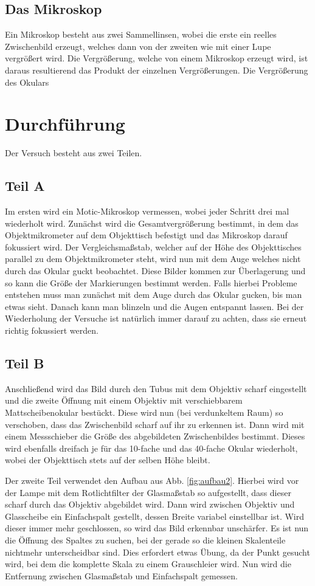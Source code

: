 \documentclass[12pt,a4paper,titlepage,headinclude,bibtotoc]{scrartcl}
\begin{document}
\subsection{Das Mikroskop}
Ein Mikroskop besteht aus zwei Sammellinsen, wobei die erste ein reelles Zwischenbild erzeugt, welches dann von der zweiten wie mit einer Lupe vergrößert wird.
Die Vergrößerung, welche von einem Mikroskop erzeugt wird, ist daraus resultierend das Produkt der einzelnen Vergrößerungen.
Die Vergrößerung des Okulars 

\section{Durchführung}
\label{sec:durchfuehrung}
Der Versuch besteht aus zwei Teilen.
\subsection{Teil A}
Im ersten wird ein Motic-Mikroskop vermessen, wobei jeder Schritt drei mal wiederholt wird.
Zunächst wird die Gesamtvergrößerung bestimmt, in dem das Objektmikrometer auf dem Objekttisch befestigt und das Mikroskop darauf fokussiert wird.
Der Vergleichsmaßstab, welcher auf der Höhe des Objekttisches parallel zu dem Objektmikrometer steht, wird nun mit dem Auge welches nicht durch das Okular guckt beobachtet.
Diese Bilder kommen zur Überlagerung und so kann die Größe der Markierungen bestimmt werden.
Falls hierbei Probleme entstehen muss man zunächst mit dem Auge durch das Okular gucken, bis man etwas sieht.
Danach kann man blinzeln und die Augen entspannt lassen.
Bei der Wiederholung der Versuche ist natürlich immer darauf zu achten, dass sie erneut richtig fokussiert werden.
\subsection{Teil B}
Anschließend wird das Bild durch den Tubus mit dem Objektiv scharf eingestellt und die zweite Öffnung mit einem Objektiv mit verschiebbarem Mattscheibenokular bestückt.
Diese wird nun (bei verdunkeltem Raum) so verschoben, dass das Zwischenbild scharf auf ihr zu erkennen ist.
Dann wird mit einem Messschieber die Größe des abgebildeten Zwischenbildes bestimmt.
Dieses wird ebenfalls dreifach je für das 10-fache und das 40-fache Okular wiederholt, wobei der Objekttisch stets auf der selben Höhe bleibt.


Der zweite Teil verwendet den Aufbau aus Abb. \ref{fig:aufbau2}.
Hierbei wird vor der Lampe mit dem Rotlichtfilter der Glasmaßstab so aufgestellt, dass dieser scharf durch das Objektiv abgebildet wird.
Dann wird zwischen Objektiv und Glasscheibe ein Einfachspalt gestellt, dessen Breite variabel einstellbar ist.
Wird dieser immer mehr geschlossen, so wird das Bild erkennbar unschärfer.
Es ist nun die Öffnung des Spaltes zu suchen, bei der gerade so die kleinen Skalenteile nichtmehr unterscheidbar sind.
Dies erfordert etwas Übung, da der Punkt gesucht wird, bei dem die komplette Skala zu einem Grauschleier wird.
Nun wird die Entfernung zwischen Glasmaßstab und Einfachspalt gemessen.
\end{document}
